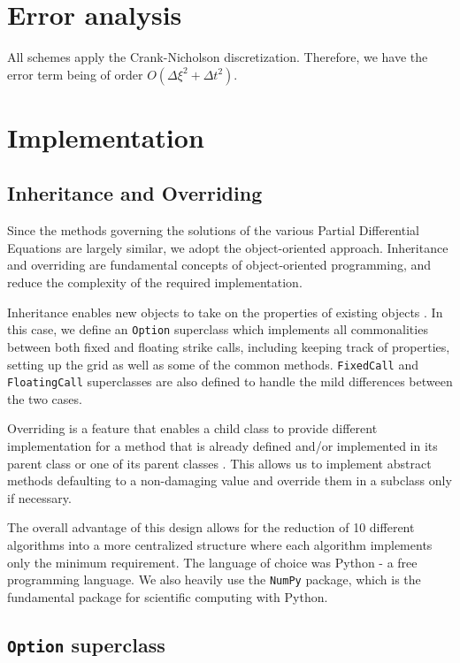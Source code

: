 \documentclass{article}
\begin{document}
\section{Error analysis}
All schemes apply the Crank-Nicholson discretization. Therefore, we have the error term being of order \(O(\Delta\xi^2 + \Delta t^2)\).

\section{Implementation}

\subsection{Inheritance and Overriding}
Since the methods governing the solutions of the various Partial Differential Equations are largely similar, we adopt the object-oriented approach. Inheritance and overriding are fundamental concepts of object-oriented programming, and reduce the complexity of the required implementation.

Inheritance enables new objects to take on the properties of existing objects \cite{oop_inheritance}. In this case, we define an \texttt{Option} superclass which implements all commonalities between both fixed and floating strike calls, including keeping track of properties, setting up the grid as well as some of the common methods. \texttt{FixedCall} and \texttt{FloatingCall} superclasses are also defined to handle the mild differences between the two cases.

Overriding is a feature that enables a child class to provide different implementation for a method that is already defined and/or implemented in its parent class or one of its parent classes \cite{oop_override}. This allows us to implement abstract methods defaulting to a non-damaging value and override them in a subclass only if necessary.

The overall advantage of this design allows for the reduction of 10 different algorithms into a more centralized structure where each algorithm implements only the minimum requirement. The language of choice was Python - a free programming language. We also heavily use the \texttt{NumPy} package, which is the fundamental package for scientific computing with Python.

\subsection{\texttt{Option} superclass}
\end{document}

